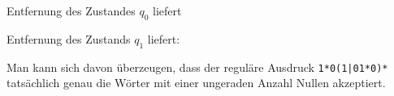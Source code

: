 \begin{loesung}
\def\l{2}
\def\r{0.4}
\def\zustand#1#2{
	\draw #1 circle[radius=\r];
	\node at #1 {$#2\mathstrut$};
}
\def\akzeptierzustand#1#2{
	\zustand{#1}{#2}
	\draw #1 circle[radius={\r-0.05}];
}
\def\punkte{
	\coordinate (S) at (-\l,0);
	\coordinate (q0) at (0,0);
	\coordinate (q1) at (\l,0);
	\coordinate (E) at ({2*\l},0);
}
\def\pfeil#1#2{
	\draw[->,shorten >= 0.4cm,shorten <= 0.4cm] #1 -- #2;
}
Entfernung des Zustandes $q_0$ liefert
\begin{center}
\end{center}
Entfernung des Zustands $q_1$ liefert:
\begin{center}
\end{center}
Man kann sich davon überzeugen, dass der reguläre Ausdruck
\texttt{1*0(1|01*0)*} tatsächlich genau die Wörter mit einer
ungeraden Anzahl Nullen akzeptiert.
\end{loesung}

